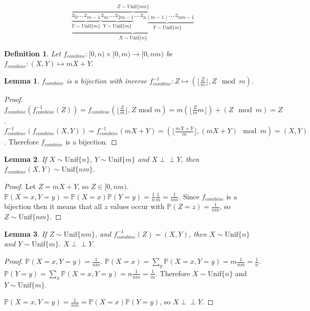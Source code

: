\documentclass[lettersize,onecolumn]{IEEEtran}
\newtheorem{lemma}{Lemma}
\newtheorem{definition}{Definition}
\newcommand{\indep}{\perp\!\!\!\perp}
\newcommand{\unif}[1]{\mathrm{Unif}\{#1\}}
\newcommand{\prob}[1]{\mathbb{P}(#1)}
\begin{document}
\[
\overbrace{    
    \underbrace{
        \underbrace{z_0 ... z_{m-1}}_{Y \sim \unif{m}}
        \underbrace{z_m ... z_{2m-1}}_{Y \sim \unif{m}}
        ...
        \underbrace{z_{n(m-1)}...z_{nm-1}}_{Y \sim \unif{m}}    
    }}_{X \sim \unif{n}}
^{Z \sim \unif{nm}}
\]

\begin{definition}
    Let $f_{combine}: [0,n)\times [0,m) \rightarrow [0,nm)$ be $f_{combine}: (X,Y) \mapsto mX+Y$.
    \label{def:combine}
\end{definition}

\begin{lemma}
    $f_{combine}$ is a bijection with inverse $f^{-1}_{combine}: Z \mapsto (\lfloor \frac{Z}{m} \rfloor, Z \mod m)$.
    \label{lem:divide}
\end{lemma}

\begin{proof}
    $f_{combine}(f^{-1}_{combine}(Z)) = f_{combine}(\lfloor \frac{Z}{m}\rfloor, Z \text{ mod } m) = m(\lfloor \frac{Z}{m}m \rfloor) + (Z \mod m) = Z$. $f^{-1}_{combine}(f_{combine}(X,Y)) = f^{-1}_{combine}(mX+Y) = (\lfloor\frac{mX+Y}{m}\rfloor, (mX+Y)\mod m) = (X,Y)$. Therefore $f_{combine}$ is a bijection.
\end{proof}

\begin{lemma}
    If $X \sim \unif{n}$, $Y \sim \unif{m}$ and $X \indep Y$, then 
    $f_{combine}(X,Y) \sim \unif{nm}$.
    \label{lem:combine}
\end{lemma}

\begin{proof}
    Let $Z = mX+Y$, so $Z \in [0,nm)$. $\prob{X=x,Y=y} = \prob{X=x}\mathbb{P}(Y=y) = \frac{1}{n}\frac{1}{m} = \frac{1}{nm}$. Since $f_{combine}$ is a bijection then it means that all $z$ values occur with $\prob{Z=z} = \frac{1}{nm}$, so $Z \sim \unif{nm}$.
    
\end{proof}

\begin{lemma}
    If $Z \sim \unif{nm}$, and $f^{-1}_{combine}(Z) = (X,Y)$, then $X \sim \unif{n}$ and $Y \sim \unif{m}$. $X \indep Y$.
    \label{lem:divide-postconditions}
\end{lemma}

\begin{proof}
    $\prob{X=x,Y=y} = \frac{1}{nm}$. $\prob{X=x} = \sum_{y}\prob{X=x,Y=y} = m\frac{1}{nm} = \frac{1}{n}$. $\prob{Y=y} = \sum_{x}\prob{X=x,Y=y} = n\frac{1}{nm} = \frac{1}{m}$. Therefore $X\sim \unif{n}$ and $Y\sim \unif{m}$.

    $\mathbb{P}(X=x,Y=y) = \frac{1}{nm} = \mathbb{P}(X=x)\mathbb{P}(Y=y)$, so $X \indep Y$.
\end{proof}
\end{document}
